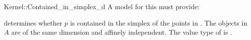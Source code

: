 \begin{ccRefFunctionObjectConcept}{Kernel::Contained_in_simplex_d}
A model for this must provide:


 {determines whether $p$ is contained in the
  simplex of the points in \ccc{A = tuple [first,last)}.  \ccPrecond
  The objects in $A$ are of the same dimension and affinely
  independent. \ccRequire The value type of  is
  .}

\end{ccRefFunctionObjectConcept}
